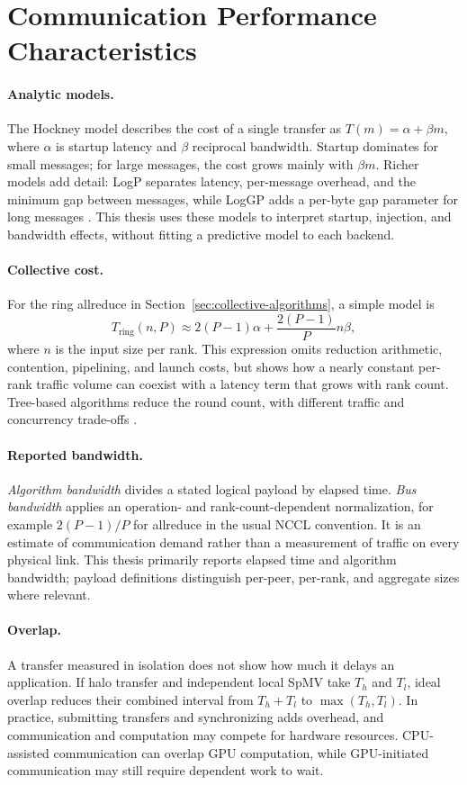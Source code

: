 \section{Communication Performance Characteristics}

\paragraph{Analytic models.}
The Hockney model describes the cost of a single transfer as $T(m) = \alpha + \beta m$, where $\alpha$ is startup latency and $\beta$ reciprocal bandwidth. Startup dominates for small messages; for large messages, the cost grows mainly with $\beta m$. Richer models add detail: LogP separates latency, per-message overhead, and the minimum gap between messages, while LogGP adds a per-byte gap parameter for long messages \cite{rico-gallego_survey_2019}. This thesis uses these models to interpret startup, injection, and bandwidth effects, without fitting a predictive model to each backend.

\paragraph{Collective cost.}
For the ring allreduce in Section~\ref{sec:collective-algorithms}, a simple model is
\[
T_{\mathrm{ring}}(n,P)\approx 2(P-1)\alpha+\frac{2(P-1)}{P}n\beta,
\]
where $n$ is the input size per rank. This expression omits reduction arithmetic, contention, pipelining, and launch costs, but shows how a nearly constant per-rank traffic volume can coexist with a latency term that grows with rank count. Tree-based algorithms reduce the round count, with different traffic and concurrency trade-offs \cite{weingram_xccl_2023}.

\paragraph{Reported bandwidth.}
\emph{Algorithm bandwidth} divides a stated logical payload by elapsed time. \emph{Bus bandwidth} applies an operation- and rank-count-dependent normalization, for example $2(P-1)/P$ for allreduce in the usual NCCL convention. It is an estimate of communication demand rather than a measurement of traffic on every physical link. This thesis primarily reports elapsed time and algorithm bandwidth; payload definitions distinguish per-peer, per-rank, and aggregate sizes where relevant.

\paragraph{Overlap.}
A transfer measured in isolation does not show how much it delays an application. If halo transfer and independent local SpMV take $T_h$ and $T_l$, ideal overlap reduces their combined interval from $T_h+T_l$ to $\max(T_h,T_l)$. In practice, submitting transfers and synchronizing adds overhead, and communication and computation may compete for hardware resources. CPU-assisted communication can overlap GPU computation, while GPU-initiated communication may still require dependent work to wait.

